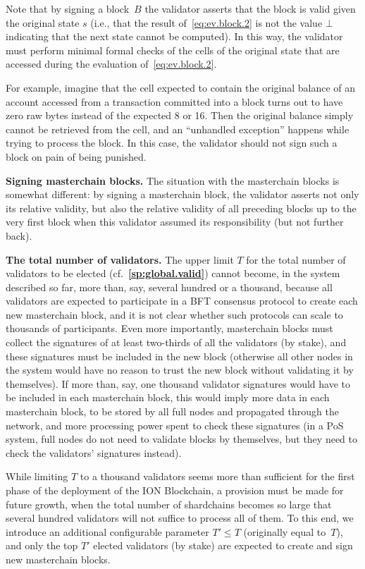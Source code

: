 \documentclass[12pt,oneside]{article}
\def\makepoint#1{\medbreak\noindent{\bf #1.\ }}
\def\nxsubpoint{\refstepcounter{subsubsection}%
  \smallbreak\makepoint{\thesubsubsection}}
\def\refpoint#1{{\rm\textbf{\ref{#1}}}}
\let\ptref=\refpoint
\def\embt(#1.){\textbf{#1.}}
\begin{document}
Note that by signing a block~$B$ the validator asserts that the block
is valid given the original state $s$ (i.e., that the result
of~\eqref{eq:ev.block.2} is not the value $\bot$ indicating that the
next state cannot be computed). In this way, the validator must
perform minimal formal checks of the cells of the original state that
are accessed during the evaluation of~\eqref{eq:ev.block.2}.

For example, imagine that the cell expected to contain the original
balance of an account accessed from a transaction committed into a
block turns out to have zero raw bytes instead of the expected 8 or
16. Then the original balance simply cannot be retrieved from the
cell, and an ``unhandled exception'' happens while trying to process
the block. In this case, the validator should not sign such a block on
pain of being punished.

\nxsubpoint \embt(Signing masterchain blocks.)  The situation with the
masterchain blocks is somewhat different: by signing a masterchain
block, the validator asserts not only its relative validity, but also
the relative validity of all preceding blocks up to the very first
block when this validator assumed its responsibility (but not further
back).

\nxsubpoint \embt(The total number of validators.)  The upper
limit $T$ for the total number of validators to be elected
(cf.~\ptref{sp:global.valid}) cannot become, in the system described
so far, more than, say, several hundred or a thousand, because all
validators are expected to participate in a BFT consensus protocol to
create each new masterchain block, and it is not clear whether such
protocols can scale to thousands of participants. Even more
importantly, masterchain blocks must collect the signatures of at
least two-thirds of all the validators (by stake), and these
signatures must be included in the new block (otherwise all other
nodes in the system would have no reason to trust the new block
without validating it by themselves). If more than, say, one thousand
validator signatures would have to be included in each masterchain
block, this would imply more data in each masterchain block, to be
stored by all full nodes and propagated through the network, and more
processing power spent to check these signatures (in a PoS system,
full nodes do not need to validate blocks by themselves, but they need
to check the validators' signatures instead).

While limiting $T$ to a thousand validators seems more than sufficient
for the first phase of the deployment of the ION Blockchain, a
provision must be made for future growth, when the total number of
shardchains becomes so large that several hundred validators will not
suffice to process all of them. To this end, we introduce an
additional configurable parameter $T'\leq T$ (originally equal
to~$T$), and only the top $T'$ elected validators (by stake) are
expected to create and sign new masterchain blocks.
\end{document}
